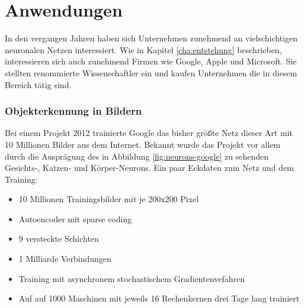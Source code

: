 \chapter{Anwendungen}
\label{cha:anwendungen}

In den vergangen Jahren haben sich Unternehmen zunehmend an vielschichtigen neuronalen Netzen interessiert. Wie in Kapitel \ref{cha:entstehung} beschrieben, interessieren sich auch zunehmend Firmen wie Google, Apple und Microsoft. Sie stellten renommierte Wissenschaftler ein und kaufen Unternehmen die in diesem Bereich tätig sind.

\subsection{Objekterkennung in Bildern}

Bei einem Projekt \citep{googleimage} 2012 trainierte Google das bisher größte Netz dieser Art mit 10 Millionen Bilder aus dem Internet. Bekannt wurde das Projekt vor allem durch die Ausprägung des in Abbildung \ref{fig:neurons-google} zu sehenden Gesichts-, Katzen- und Körper-Neurons. Ein paar Eckdaten zum Netz und dem Training:

\begin{itemize}
\item 10 Millionen Trainingsbilder mit je 200x200 Pixel
\item Autoencoder mit sparse coding
\item 9 versteckte Schichten
\item 1 Milliarde Verbindungen
\item Training mit asynchronem stochastischem Gradientenvefahren
\item Auf auf 1000 Maschinen mit jeweils 16 Rechenkernen drei Tage lang trainiert
\end{itemize}

